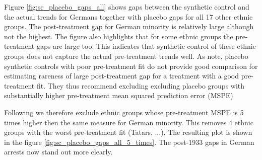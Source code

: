 Figure \ref{fig:sc_placebo_gaps_all} shows gaps between the synthetic control and the actual trends for Germans together with placebo gaps for all 17 other ethnic groups. The post-treatment gap for German minority is relatively large although not the highest. The figure also highlights that for some ethnic groups the pre-treatment gaps are large too. This indicates that synthetic control of these ethnic groups does not capture the actual pre-treatment trends well. As \citet{abadie_synthetic_2010} note, placebo synthetic controls  with poor pre-treatment fit do not provide good comparison
for estimating rareness of large  post-treatment gap for a treatment with a good pre-treatment fit. They thus recommend excluding excluding placebo groups with substantially higher pre-treatment mean squared prediction error  (MSPE)

Following \citet{abadie_synthetic_2010}  we therefore exclude ethnic groups whose pre-treatment MSPE is 5 times higher then the same measure for German minority. This removes 4 ethnic groups with the worst pre-treatment fit (Tatars, ...). The resulting plot is shown in the figure \ref{fig:sc_placebo_gaps_all_5_times}. The post-1933 gaps in German arrests now stand out more clearly. 

